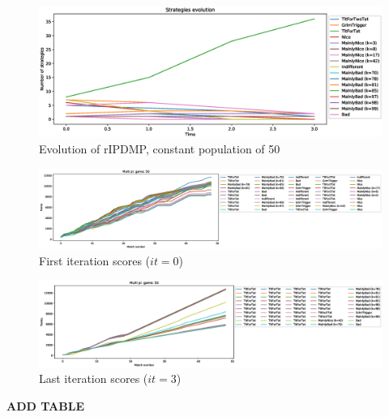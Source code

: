 \documentclass[journal,a4paper,10pt,twoside]{IEEEtran} %
\begin{document}
\begin{figure}[!ht]
    \centering
    \includegraphics[width=1\columnwidth]{../img/ripdmp-const/ripdmp-evolution-const-pop-50}
    \caption{Evolution of rIPDMP, constant population of 50}
    \label{fig:constR}
\end{figure}

\begin{figure}[!ht]
    \centering
    \includegraphics[width=1\columnwidth]{../img/ripdmp-const/ripdmp-scores-const-pop-50-r0}
    \caption{First iteration scores ($it=0$)}
    \label{fig:constFI}
\end{figure}

\begin{figure}[!ht]
    \centering
    \includegraphics[width=1\columnwidth]{../img/ripdmp-const/ripdmp-scores-const-pop-50-r3}
    \caption{Last iteration scores ($it=3$)}
    \label{fig:constLI}
\end{figure}

\textbf{ADD TABLE}
\end{document}
